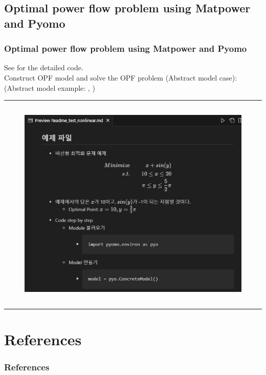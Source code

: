 \documentclass[
	11pt, %
	aspectratio=169, %
]{beamer}
\begin{document}
\subsection{Optimal power flow problem using Matpower and Pyomo}
\begin{frame}
	\frametitle{Optimal power flow problem using Matpower and Pyomo}

	See \href{https://github.com/kwoong2001/pyomoatoz/blob/main/Optimal_Power_Flow/Distribution/33Bus_matpower/OPF_Case_33bw_without_switch_and_matpower.py}{} for the detailed code.\\
	
	Construct OPF model and solve the OPF problem (Abstract model case):\\
	\footnotesize (Abstract model example: \href{https://pyomo.readthedocs.io/en/6.8.0/pyomo_overview/abstract_concrete.html}{}, \href{https://medium.com/@ZiaH919/benchmarking-pyomo-13ab233d8d5b}{})

	\rule{\textwidth}{1pt}
	
	\begin{columns}
		\begin{column}{0.5\textwidth}
			\begin{figure}
				\includegraphics[width=2 in,keepaspectratio]{pyomo_example.png}
			\end{figure}
		\end{column}
	\end{columns}

	\rule{\textwidth}{1pt}


\end{frame}
	


\section{References}


\begin{frame} %
	\frametitle{References}
	
	\printbibliography
	
	
\end{frame}
\end{document}
